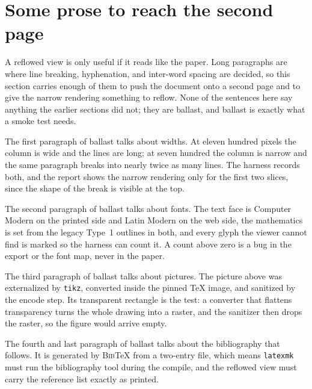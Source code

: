 \documentclass[11pt]{article}
\theoremstyle{definition}
\begin{document}
\section{Some prose to reach the second page}

A reflowed view is only useful if it reads like the paper. Long paragraphs
are where line breaking, hyphenation, and inter-word spacing are decided,
so this section carries enough of them to push the document onto a second
page and to give the narrow rendering something to reflow. None of the
sentences here say anything the earlier sections did not; they are ballast,
and ballast is exactly what a smoke test needs.

The first paragraph of ballast talks about widths. At eleven hundred pixels
the column is wide and the lines are long; at seven hundred the column is
narrow and the same paragraph breaks into nearly twice as many lines. The
harness records both, and the report shows the narrow rendering only for
the first two slices, since the shape of the break is visible at the top.

The second paragraph of ballast talks about fonts. The text face is
Computer Modern on the printed side and Latin Modern on the web side, the
mathematics is set from the legacy Type~1 outlines in both, and every glyph
the viewer cannot find is marked so the harness can count it. A count above
zero is a bug in the export or the font map, never in the paper.

The third paragraph of ballast talks about pictures. The picture above was
externalized by \texttt{tikz}, converted inside the pinned \TeX{} image, and
sanitized by the encode step. Its transparent rectangle is the test: a
converter that flattens transparency turns the whole drawing into a raster,
and the sanitizer then drops the raster, so the figure would arrive empty.

The fourth and last paragraph of ballast talks about the bibliography that
follows. It is generated by \textsc{Bib}\TeX{} from a two-entry file, which
means \texttt{latexmk} must run the bibliography tool during the compile,
and the reflowed view must carry the reference list exactly as printed.



\end{document}
